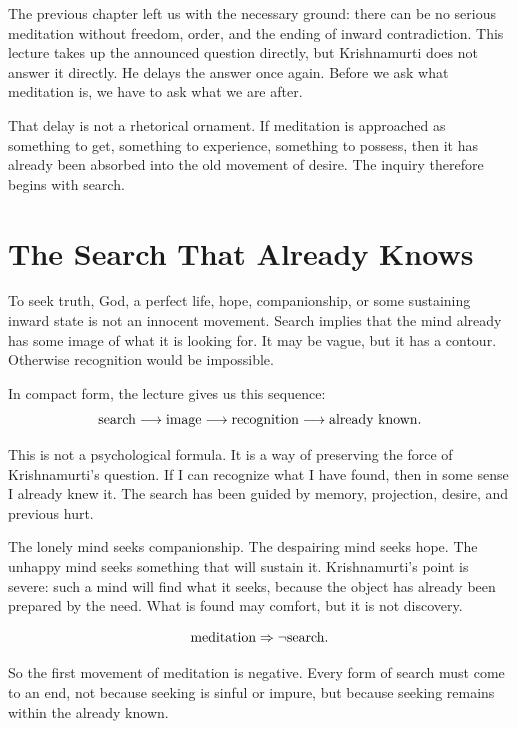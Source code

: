 \documentclass[11pt,oneside]{book}
\begin{document}
The previous chapter left us with the necessary ground: there can be no serious meditation without freedom, order, and the ending of inward contradiction. This lecture takes up the announced question directly, but Krishnamurti does not answer it directly. He delays the answer once again. Before we ask what meditation is, we have to ask what we are after.

That delay is not a rhetorical ornament. If meditation is approached as something to get, something to experience, something to possess, then it has already been absorbed into the old movement of desire. The inquiry therefore begins with search.

\section{The Search That Already Knows}

To seek truth, God, a perfect life, hope, companionship, or some sustaining inward state is not an innocent movement. Search implies that the mind already has some image of what it is looking for. It may be vague, but it has a contour. Otherwise recognition would be impossible.

In compact form, the lecture gives us this sequence:
\begin{equation}
\hbox{search}
\longrightarrow
\hbox{image}
\longrightarrow
\hbox{recognition}
\longrightarrow
\hbox{already known}.
\end{equation}

This is not a psychological formula. It is a way of preserving the force of Krishnamurti's question. If I can recognize what I have found, then in some sense I already knew it. The search has been guided by memory, projection, desire, and previous hurt.

The lonely mind seeks companionship. The despairing mind seeks hope. The unhappy mind seeks something that will sustain it. Krishnamurti's point is severe: such a mind will find what it seeks, because the object has already been prepared by the need. What is found may comfort, but it is not discovery.

\begin{equation}
\hbox{meditation}
\Rightarrow
\neg \hbox{search}.
\end{equation}

So the first movement of meditation is negative. Every form of search must come to an end, not because seeking is sinful or impure, but because seeking remains within the already known.
\end{document}

